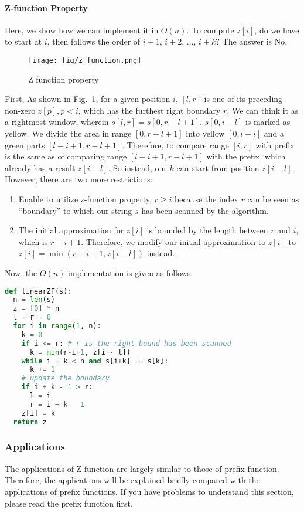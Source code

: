 \documentclass[../main.tex]{subfiles}
\begin{document}
\paragraph{Z-function Property}
Here, we show how we can implement it in $O(n)$. To compute $z[i]$, do we have to start at $i$, then follows the order of $i+1$, $i+2$, ..., $i+k$? The answer is No.
\begin{figure}[h]
    \centering
    \texttt{[image: fig/z\_function.png]}
    \caption{Z function property}
    \label{fig:z_function_property}
\end{figure}
First, As shown in Fig.~\ref{fig:z_function_property}, for a given position $i$,  $[l, r]$ is one of its preceding non-zero $z[p], p< i$, which has the furthest right boundary $r$. We can think it as a rightmost window, wherein $s[l, r] = s[0, r-l+1]$.  $s[0, i-l]$ is marked as yellow. We divide the area in range $[0, r-l+1]$ into yellow $[0, l-i]$ and a green parts $[l-i+1, r-l+1]$. Therefore, to compare range $[i, r]$ with prefix is the same as of comparing range $[l-i+1, r-l+1]$ with the prefix, which already has a result $z[i-l]$. So instead, our $k$ can start from position $z[i-l]$. However, there are two more restrictions:
\begin{enumerate}
    \item Enable to utilize z-function property, $r \geq i$ because the index $r$ can be seen as ``boundary'' to which our string $s$ has been scanned by the algorithm. 
    \item The initial approximation for $z[i]$ is bounded by the length between $r$ and $i$, which is $r-i+1$. Therefore, we modify our initial approximation to $z[i]$ to $z[i] = \min(r-i+1, z[i-l])$ instead.
\end{enumerate}

Now, the $O(n)$ implementation is given as follows:
\begin{lstlisting}[language=Python]
def linearZF(s):
  n = len(s)
  z = [0] * n
  l = r = 0
  for i in range(1, n): 
    k = 0
    if i <= r: # r is the right bound has been scanned
      k = min(r-i+1, z[i - l])
    while i + k < n and s[i+k] == s[k]:
      k += 1
    # update the boundary
    if i + k - 1 > r:
      l = i
      r = i + k - 1 
    z[i] = k 
  return z
\end{lstlisting}

\subsubsection{Applications}
The applications of Z-function are largely similar to those of prefix function. Therefore, the applications will be explained briefly compared with the applications of prefix functions. If you have problems to understand this section, please read the prefix function first.
\end{document}
